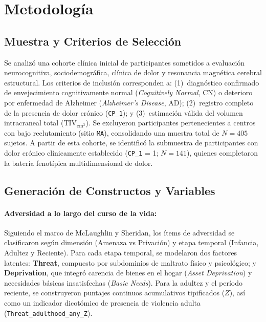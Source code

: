 \documentclass[11pt,a4paper]{article}
\begin{document}
\section{Metodología}

\subsection{Muestra y Criterios de Selección}
Se analizó una cohorte clínica inicial de participantes sometidos a evaluación neurocognitiva, sociodemográfica, clínica de dolor y resonancia 
magnética cerebral estructural. Los criterios de inclusión corresponden a: (1)~diagnóstico confirmado de envejecimiento cognitivamente normal (\textit{Cognitively Normal}, CN)
o deterioro por enfermedad de Alzheimer (\textit{Alzheimer's Disease}, AD); (2)~registro completo de la presencia de dolor crónico (\texttt{CP\_1}); y (3)~estimación 
válida del volumen intracraneal total (\texttt{$\text{TIV}_{\text{cm}^3}$}). Se excluyeron participantes pertenecientes a centros con bajo reclutamiento (sitio \texttt{MA}),
consolidando una muestra total de $N = 405$ sujetos. A partir de esta cohorte, se identificó la submuestra de participantes con dolor crónico clínicamente establecido 
(\texttt{CP\_1} = 1; $N = 141$), quienes completaron la batería fenotípica multidimensional de dolor. 

\subsection{Generación de Constructos y Variables}

\paragraph{Adversidad a lo largo del curso de la vida:}
Siguiendo el marco de McLaughlin y Sheridan, los ítems de adversidad se clasificaron según dimensión (Amenaza vs Privación) y etapa temporal (Infancia, Adultez y Reciente).
Para cada etapa temporal, se modelaron dos factores latentes: \textbf{Threat}, compuesto por subdominios de maltrato físico y psicológico; y \textbf{Deprivation}, que 
integró carencia de bienes en el hogar (\textit{Asset Deprivation}) y necesidades básicas insatisfechas (\textit{Basic Needs}). Para la adultez y el período reciente, se construyeron 
puntajes continuos acumulativos tipificados ($Z$), así como un indicador dicotómico de presencia de violencia adulta (\texttt{Threat\_adulthood\_any\_Z}).
\end{document}
